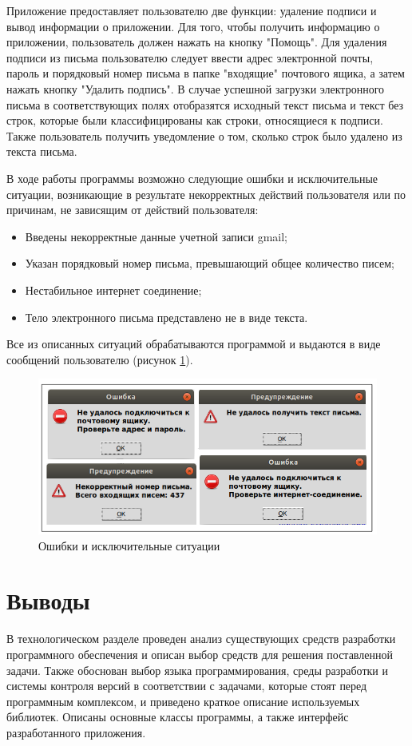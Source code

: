 Приложение предоставляет пользователю две функции: удаление подписи и вывод информации о приложении. Для того, чтобы получить информацию о приложении, пользователь должен нажать на кнопку "Помощь". Для удаления подписи из письма пользователю следует ввести адрес электронной почты, пароль и порядковый номер письма в папке "входящие"  почтового ящика, а затем нажать кнопку "Удалить подпись". В случае успешной загрузки электронного письма в соответствующих полях отобразятся исходный текст письма и текст без строк, которые были классифицированы как строки, относящиеся к подписи. Также пользователь получить уведомление о том, сколько строк было удалено из текста письма.

В ходе работы программы возможно следующие ошибки и исключительные ситуации, возникающие в результате некорректных действий пользователя или по причинам, не зависящим от действий пользователя:

\begin{itemize}
	\item Введены некорректные данные учетной записи gmail;
	\item Указан порядковый номер письма, превышающий общее количество писем;
	\item Нестабильное интернет соединение;
	\item Тело электронного письма представлено не в виде текста.
\end{itemize}

Все из описанных ситуаций обрабатываются программой и выдаются в виде сообщений пользователю (рисунок \ref{impl:errors}).

\newpage
\begin{figure}[h!]
	\centering
	\includegraphics[width=\textwidth]{inc/img/errors.png}
	\caption{Ошибки и исключительные ситуации}
	\label{impl:errors}
\end{figure}


\newpage
\section{Выводы}
В технологическом разделе проведен анализ существующих средств разработки программного обеспечения и описан выбор средств для решения поставленной задачи. Также обоснован выбор языка программирования, среды разработки и системы контроля версий в соответствии с задачами, которые стоят перед программным комплексом, и приведено краткое описание используемых библиотек. Описаны основные классы программы, а также интерфейс разработанного приложения.


